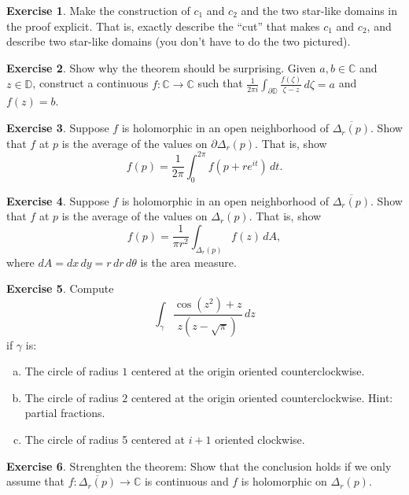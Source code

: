 \documentclass[12pt,openany]{book}
\newcommand{\C}{{\mathbb{C}}}
\newcommand{\D}{{\mathbb{D}}}
\newcommand{\myquote}[1]{``#1''}
\theoremstyle{plain}
\theoremstyle{remark}
\theoremstyle{definition}
\newenvironment{exbox}{%
    \def\FrameCommand{\vrule width 1pt \relax\hspace{10pt}}%
    \MakeFramed{\advance\hsize-\width\FrameRestore}%
}{%
    \endMakeFramed
}
\newenvironment{exparts}{%
    \leavevmode\begin{enumerate}[a),noitemsep,topsep=0pt,parsep=0pt,partopsep=0pt]
}{%
    \end{enumerate}
}
\theoremstyle{exercise}
\newtheorem{exercise}{Exercise}[section]
\theoremstyle{example}
\begin{document}
\begin{exbox}
\begin{exercise}
Make the construction of $c_1$ and $c_2$ and the two star-like domains
in the proof explicit.  That is, exactly describe the \myquote{cut} that makes
$c_1$ and $c_2$, and describe two star-like domains (you don't have to do the
two pictured).
\end{exercise}

\begin{exercise}
Show why the theorem should be surprising.  Given $a,b \in \C$ and $z \in \D$,
construct a continuous 
$f \colon \C \to \C$ such that $\frac{1}{2\pi i}\int_{\partial \D}
\frac{f(\zeta)}{\zeta -z} \, d\zeta = a$ and $f(z) = b$.
\end{exercise}

\begin{exercise}
Suppose $f$ is holomorphic in an open neighborhood of $\overline{\Delta_r(p)}$.
Show that $f$ at $p$ is the average of the values on $\partial \Delta_r(p)$.
That is, show
\begin{equation*}
f(p) = \frac{1}{2\pi} \int_0^{2\pi} f(p + r e^{it}) \, dt .
\end{equation*}
\end{exercise}

\begin{exercise}
Suppose $f$ is holomorphic in an open neighborhood of $\overline{\Delta_r(p)}$.
Show that $f$ at $p$ is the average of the values on $\Delta_r(p)$.
That is, show
\begin{equation*}
f(p) = \frac{1}{\pi r^2} \int_{\Delta_r(p)} f(z) \, dA ,
\end{equation*}
%
where $dA = dx \, dy = r \, dr \, d\theta$ is the area measure.
\end{exercise}

\begin{exercise}
Compute 
\begin{equation*}
\int_\gamma \frac{\cos ( z^2 ) +z}{z(z-\sqrt{\pi})} \, dz
\end{equation*}
if $\gamma$ is:
\begin{exparts}
\item
The circle of radius $1$ centered at the origin oriented
counterclockwise.
\item
The circle of radius $2$ centered at the origin oriented
counterclockwise.  Hint: partial fractions.
\item
The circle of radius 5 centered at $i+1$ oriented clockwise.
\end{exparts}
\end{exercise}

\begin{exercise} \label{exercise:strongerCIFdisc}
Strenghten the theorem:  Show that the conclusion holds if
we only assume that $f \colon \overline{\Delta_r(p)} \to \C$
is continuous and $f$ is holomorphic on $\Delta_r(p)$.
\end{exercise}
\end{exbox}
\end{document}
